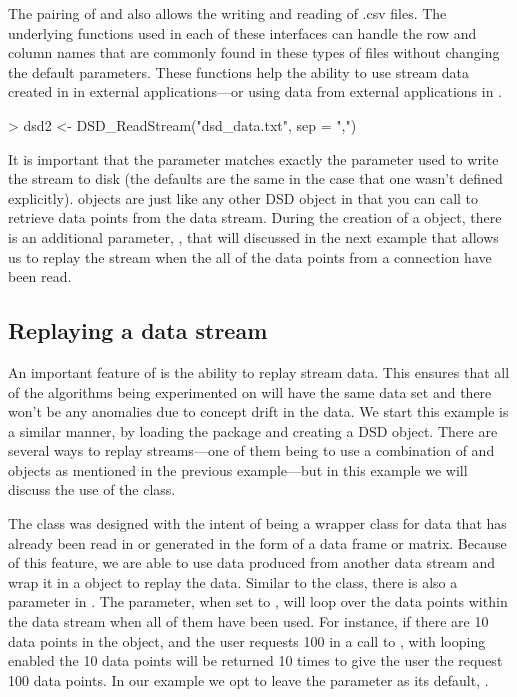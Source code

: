 \documentclass[nojss]{jss}
\begin{document}
The pairing of  and  also allows the writing and reading of .csv files. The underlying functions used in each of these interfaces can handle the row and column names that are commonly found in these types of files without changing the default parameters. These functions help the ability to use stream data created in  in external applications---or using data from external applications in .

\begin{Schunk}
\begin{Sinput}
> dsd2 <- DSD_ReadStream("dsd_data.txt", sep = ",")
\end{Sinput}
\end{Schunk}

It is important that the  parameter matches exactly the  parameter used to write the stream to disk (the defaults are the same in the case that one wasn't defined explicitly).  objects are just like any other DSD object in that you can call  to retrieve data points from the data stream. During the creation of a  object, there is an additional parameter, , that will discussed in the next example that allows us to replay the stream when the all of the data points from a connection have been read. 

\subsection{Replaying a data stream}
\label{examples:replay}

An important feature of  is the ability to replay stream data. This ensures that all of the algorithms being experimented on will have the same data set and there won't be any anomalies due to concept drift in the data. We start this example is a similar manner, by loading the package and creating a DSD object. There are several ways to replay streams---one of them being to use a combination of  and  objects as mentioned in the previous example---but in this example we will discuss the use of the  class.

The  class was designed with the intent of being a wrapper class for data that has already been read in or generated in the form of a data frame or matrix. Because of this feature, we are able to use data produced from another data stream and wrap it in a  object to replay the data. Similar to the  class, there is also a  parameter in . The  parameter, when set to , will loop over the data points within the data stream when all of them have been used. For instance, if there are 10 data points in the object, and the user requests 100 in a call to , with looping enabled the 10 data points will be returned 10 times to give the user the request 100 data points. In our example we opt to leave the  parameter as its default, .
\end{document}
